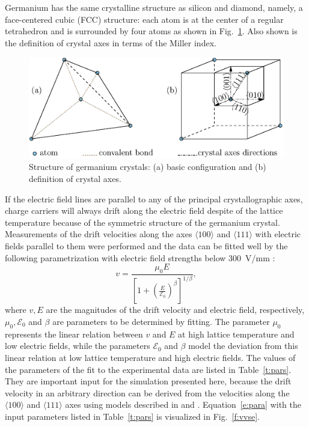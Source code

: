 \documentclass[epj]{svjour}
\begin{document}
Germanium has the same crystalline structure as silicon and diamond,
namely, a face-centered cubic (FCC) structure: each atom is at the
center of a regular tetrahedron and is surrounded by four atoms as
shown in Fig.~\ref{f:xtal}. Also shown is the definition of crystal
axes in terms of the Miller index.
\begin{figure}[htpb]
\centering
\includegraphics[width=\linewidth]{xtalStruc}   
\caption{Structure of germanium crystals: (a) basic configuration and
(b) definition of crystal axes.}
\label{f:xtal} 
\end{figure} 
 
If the electric field lines are parallel to any of the principal
crystallographic axes, charge carriers will always drift along the
electric field despite of the lattice temperature because of the
symmetric structure of the germanium crystal. Measurements of the
drift velocities along the axes $\langle 100 \rangle$ and $\langle 111
\rangle$ with electric fields parallel to them were performed
\cite{miha,reg} and the data can be fitted well by the following
parametrization \cite{Kno99} with electric field strengths below
300~V/mm \cite{miha}:
\begin{equation} 
\label{e:para} 
v = \frac{\mu_{0}E}{[1+(\frac{E}{\mathcal{E}_{0}})^{\beta}]^{1/\beta}}, 
\end{equation} 
where $v,E$ are the magnitudes of the drift velocity and electric
field, respectively, $\mu_{0},\mathcal{E}_{0}$ and $\beta$ are
parameters to be determined by fitting. The parameter $\mu_{0}$
represents the linear relation between $v$ and $E$ at high lattice
temperature and low electric fields, while the parameters
$\mathcal{E}_{0}$ and $\beta$ model the deviation from this linear
relation at low lattice temperature and high electric fields. The
values of the parameters of the fit to the experimental data are
listed in Table~\ref{t:pars}. They are important input for the
simulation presented here, because the drift velocity in an arbitrary
direction can be derived from the velocities along the $\langle 100
\rangle$ and $\langle 111 \rangle$ axes using models described in
\cite{miha} and \cite{bart}. Equation~\ref{e:para} with the input
parameters listed in Table~\ref{t:pars} is visualized in
Fig.~\ref{f:vvse}.
 
\end{document}
